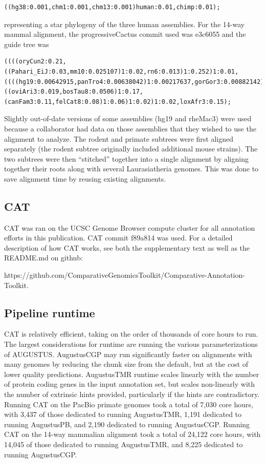 \documentclass[fleqn,10pt]{wlscirep}
\begin{document}
\begin{lstlisting}[breaklines=true]
((hg38:0.001,chm1:0.001,chm13:0.001)human:0.01,chimp:0.01);
\end{lstlisting}
    
representing a star phylogeny of the three human assemblies. For the 14-way mammal alignment, the progressiveCactus commit used was e3c6055 and the guide tree was 
    
\begin{lstlisting}[breaklines=true]
((((oryCun2:0.21,((Pahari_EiJ:0.03,mm10:0.025107)1:0.02,rn6:0.013)1:0.252)1:0.01,((((hg19:0.00642915,panTro4:0.00638042)1:0.00217637,gorGor3:0.00882142)1:0.00935116,ponAbe2:0.0185056)1:0.00440069,rheMac3:0.007)1:0.1)1:0.02,((oviAri3:0.019,bosTau8:0.0506)1:0.17,(canFam3:0.11,felCat8:0.08)1:0.06)1:0.02)1:0.02,loxAfr3:0.15);
\end{lstlisting}
    
    
Slightly out-of-date versions of some assemblies (hg19 and rheMac3) were used because a collaborator had data on those assemblies that they wished to use the alignment to analyze. The rodent and primate subtrees were first aligned separately (the rodent subtree originally included additional mouse strains). The two subtrees were then “stitched” together into a single alignment by aligning together their roots along with several Laurasiatheria genomes. This was done to save alignment time by reusing existing alignments.

\subsection*{CAT}
CAT was ran on the UCSC Genome Browser compute cluster for all annotation efforts in this publication. CAT commit f89a814 was used. For a detailed description of how CAT works, see both the supplementary text as well as the README.md on github:

https://github.com/ComparativeGenomicsToolkit/Comparative-Annotation-Toolkit. 

\subsection*{Pipeline runtime}
CAT is relatively efficient, taking on the order of thousands of core hours to run. The largest considerations for runtime are running the various parameterizations of AUGUSTUS. AugustusCGP may run significantly faster on alignments with many genomes by reducing the chunk size from the default, but at the cost of lower quality predictions. AugustusTMR runtime scales linearly with the number of protein coding genes in the input annotation set, but scales non-linearly with the number of extrinsic hints provided, particularly if the hints are contradictory. 
Running CAT on the PacBio primate genomes took a total of 7,030 core hours, with 3,437 of those dedicated to running AugustusTMR, 1,191 dedicated to running AugustusPB, and 2,190 dedicated to running AugustusCGP. Running CAT on the 14-way mammalian alignment took a total of 24,122 core hours, with 14,045 of those dedicated to running AugustusTMR, and 8,225 dedicated to running AugustusCGP.
\end{document}
